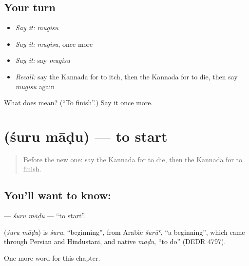 \subsection*{Your turn}
\begin{itemize}
\raggedright
  \item \emph{Say it:} \emph{mugisu}
  \item \emph{Say it:} \emph{mugisu}, once more
  \item \emph{Say it:} say \emph{mugisu}
  \item \emph{Recall:} say the Kannada for to itch, then the Kannada for to die, then say \emph{mugisu} again
\end{itemize}

\begin{tcolorbox}[breakable,colback=teal!4,colframe=teal!35!black,title={Before you move on}]
What does  mean? (\textquotedblleft{}To finish\textquotedblright{}.) Say it once more.
\end{tcolorbox}
\section[\texorpdfstring{\kn{ಶುರು} \kn{ಮಾಡು} (śuru māḍu)}{ಶುರು ಮಾಡು (śuru māḍu)}]{  (śuru māḍu) — to start}

\label{lesson:KA-C200-suru-madu}



\begin{quote}
Before the new one: say the Kannada for to die, then the Kannada for to finish.
\end{quote}

\subsection*{You'll want to know:  }
\textbf{ } — \emph{śuru māḍu} — \textquotedblleft{}to start\textquotedblright{}.

\begin{cousinweb}
\textbf{ } (\emph{śuru māḍu}) is \emph{śuru}, \textquotedblleft{}beginning\textquotedblright{}, from Arabic \emph{šurūʿ}, \textquotedblleft{}a beginning\textquotedblright{}, which came through Persian and Hindustani, and native \emph{māḍu}, \textquotedblleft{}to do\textquotedblright{} (DEDR 4797).
\end{cousinweb}

\begin{grammarlens}[title={What you've built}]
One more word for this chapter.
\end{grammarlens}

